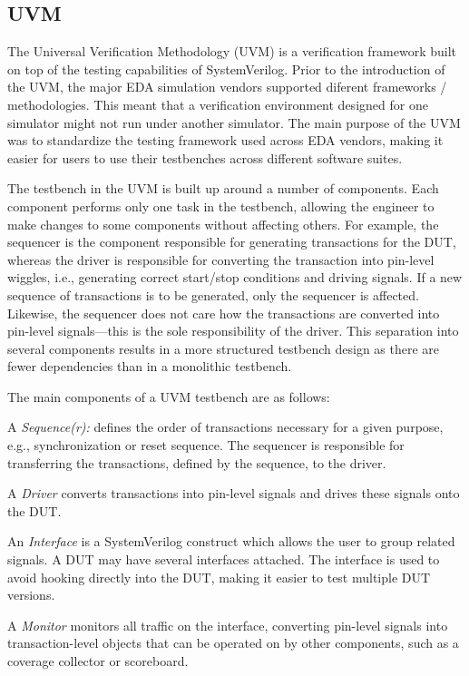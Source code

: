 \documentclass[conference]{IEEEtran}
\begin{document}
\subsection{UVM}
The Universal Verification Methodology (UVM) is a verification framework built on top of the testing capabilities of SystemVerilog. Prior to the introduction of the UVM, the major EDA simulation vendors supported diferent frameworks / methodologies. This meant that a verification environment designed for one simulator might not run under another simulator. The main purpose of the UVM was to standardize the testing framework used across EDA vendors, making it easier for users to use their testbenches across different software suites.

The testbench in the UVM is built up around a number of components.
Each component performs only one task in the testbench, allowing the engineer to make changes to some components without affecting others. 
For example, the sequencer is the component responsible for generating transactions for the DUT, whereas the driver is responsible for converting the transaction into pin-level wiggles, i.e., generating correct start/stop conditions and
driving signals. If a new sequence of transactions is to be generated, only the sequencer is affected. Likewise, the sequencer does not care how the transactions are converted into pin-level signals---this is the sole responsibility of the driver. This separation into several components results in a more structured testbench design as there are fewer dependencies than in a monolithic testbench.

The main components of a UVM testbench are as follows:

    A \textit{Sequence(r):} defines the order of transactions necessary for a given purpose, e.g., synchronization or reset sequence. The sequencer is responsible for transferring the transactions, defined by the sequence, to the driver.
    
    A \textit{Driver} converts transactions into pin-level signals and drives these signals onto the DUT.
    
    An \textit{Interface} is a SystemVerilog construct which allows the user to group related signals. A DUT may have several interfaces attached.
    The interface is used to avoid hooking directly into the DUT, making it easier to test multiple DUT versions.
    
    A \textit{Monitor} monitors all traffic on the interface, converting pin-level signals into transaction-level objects that can be operated on by other components, such as a coverage collector or scoreboard.
    
\end{document}
